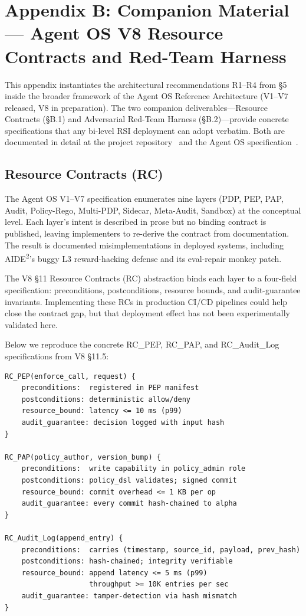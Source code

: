 
\section*{Appendix B: Companion Material --- Agent OS V8 Resource Contracts and Red-Team Harness}

This appendix instantiates the architectural recommendations R1--R4 from \S5 inside the broader framework of the Agent OS Reference Architecture (V1--V7 released, V8 in preparation). The two companion deliverables---Resource Contracts (\S B.1) and Adversarial Red-Team Harness (\S B.2)---provide concrete specifications that any bi-level RSI deployment can adopt verbatim. Both are documented in detail at the project repository~\cite{anon2026bi} and the Agent OS specification~\cite{anon2026aosv8}.

\subsection{Resource Contracts (RC)}

The Agent OS V1--V7 specification enumerates nine layers (PDP, PEP, PAP, Audit, Policy-Rego, Multi-PDP, Sidecar, Meta-Audit, Sandbox) at the conceptual level. Each layer's intent is described in prose but no binding contract is published, leaving implementers to re-derive the contract from documentation. The result is documented misimplementations in deployed systems, including AIDE\textsuperscript{2}'s buggy L3 reward-hacking defense and its eval-repair monkey patch.

The V8 \S11 Resource Contracts (RC) abstraction binds each layer to a four-field specification: preconditions, postconditions, resource bounds, and audit-guarantee invariants. Implementing these RCs in production CI/CD pipelines could help close the contract gap, but that deployment effect has not been experimentally validated here.

Below we reproduce the concrete RC\_PEP, RC\_PAP, and RC\_Audit\_Log specifications from V8 \S11.5:

\begin{verbatim}
RC_PEP(enforce_call, request) {
    preconditions:  registered in PEP manifest
    postconditions: deterministic allow/deny
    resource_bound: latency <= 10 ms (p99)
    audit_guarantee: decision logged with input hash
}

RC_PAP(policy_author, version_bump) {
    preconditions:  write capability in policy_admin role
    postconditions: policy_dsl validates; signed commit
    resource_bound: commit overhead <= 1 KB per op
    audit_guarantee: every commit hash-chained to alpha
}

RC_Audit_Log(append_entry) {
    preconditions:  carries (timestamp, source_id, payload, prev_hash)
    postconditions: hash-chained; integrity verifiable
    resource_bound: append latency <= 5 ms (p99)
                    throughput >= 10K entries per sec
    audit_guarantee: tamper-detection via hash mismatch
}
\end{verbatim}

